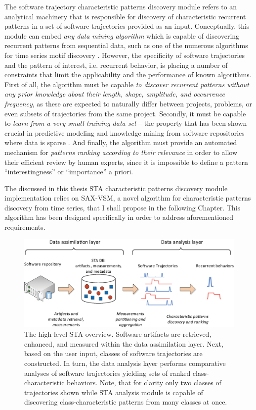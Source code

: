 The software trajectory characteristic patterns discovery module refers to an analytical machinery that 
is responsible for discovery of characteristic recurrent patterns in a set of software trajectories provided as 
an input. Conceptually, this module can embed \textit{any data mining algorithm} which is capable of 
discovering recurrent patterns from sequential data, such as one of the numerous algorithms for time series 
motif discovery \cite{citeulike:13197378}.
However, the specificity of software trajectories and the pattern of interest, i.e. recurrent behavior, 
is placing a number of constraints that limit the applicability and the performance of known algorithms.
First of all, the algorithm must be capable \textit{to discover recurrent patterns without any prior knowledge 
about their length, shape, amplitude, and occurrence frequency}, as these are expected to naturally differ 
between projects, problems, or even subsets of trajectories from the same project.
Secondly, it must be capable to \textit{learn from a very small training data set} --
the property that has been shown crucial in predictive modeling and knowledge mining from software 
repositories where data is sparse \cite{citeulike:6055293}.
And finally, the algorithm must provide an automated mechanism for 
\textit{patterns ranking according to their relevance} in order to allow their efficient 
review by human experts, since it is impossible to define a pattern ``interestingness'' or 
``importance'' a priori.

The discussed in this thesis STA characteristic patterns discovery module implementation relies on SAX-VSM,
a novel algorithm for characteristic patterns discovery from time series, that I shall propose in the following Chapter. 
This algorithm has been designed specifically in order to address aforementioned requirements.

\begin{figure}[t]
   \centering
   \includegraphics[width=150mm]{figures/Flow-analysis.eps}
   \caption{The high-level STA overview. Software artifacts are retrieved, enhanced, and measured within the
   data assimilation layer. Next, based on the user input, classes of software trajectories are constructed.   
   In turn, the data analysis layer performs comparative analyses of software trajectories yielding sets
   of ranked class-characteristic behaviors.
   Note, that for clarity only two classes of trajectories shown while STA analysis module is capable of
   discovering class-characteristic patterns from many classes at once.}
   \label{fig:sta-full-overview}
\end{figure}

